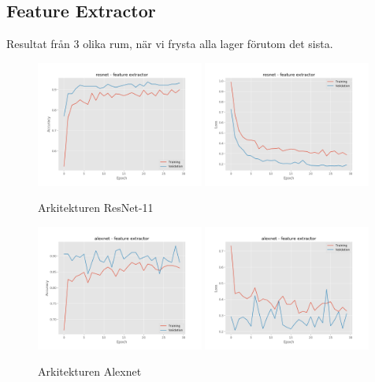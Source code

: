 \documentclass{kththesis}
\begin{document}
    \subsection{Feature Extractor}
    Resultat från 3 olika rum, när vi frysta alla lager förutom det sista.

    \begin{figure}
      \centering
      \includegraphics[width=0.49\textwidth]{"./room/room-classification - acc - resnet - feature extractor"}
      \includegraphics[width=0.49\textwidth]{"./room/room-classification - loss - resnet - feature extractor"}
      \caption{Arkitekturen ResNet-11}
    \end{figure}
    \begin{figure}
      \centering
      \includegraphics[width=0.49\textwidth]{"./room/room-classification - acc - alexnet - feature extractor"}
      \includegraphics[width=0.49\textwidth]{"./room/room-classification - loss - alexnet - feature extractor"}
      \caption{Arkitekturen Alexnet}
    \end{figure}
\end{document}
